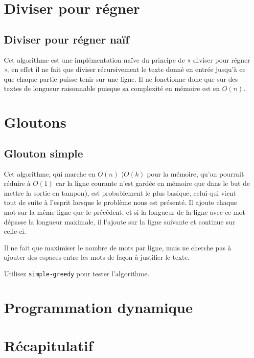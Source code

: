 \documentclass[a4paper, 11pt]{article}
\begin{document}
\section{Diviser pour régner}

\subsection{Diviser pour régner naïf}

Cet algorithme est une implémentation naïve du principe de « diviser pour régner
», en effet il ne fait que diviser récursivement le texte donné en entrée
jusqu'à ce que chaque partie puisse tenir sur une ligne. Il ne fonctionne donc
que sur des textes de longueur raisonnable puisque sa complexité en mémoire est
en $O(n)$. %

\section{Gloutons}

\subsection{Glouton simple}

Cet algorithme, qui marche en $O(n)$ ($O(k)$ pour la mémoire, qu'on pourrait
réduire à $O(1)$ car la ligne courante n'est gardée en mémoire que dans le but
de mettre la sortie en tampon), est probablement le plus basique, celui qui
vient tout de suite à l'esprit lorsque le problème nous est présenté. Il ajoute
chaque mot sur la même ligne que le précédent, et si la longueur de la ligne
avec ce mot dépasse la longueur maximale, il l'ajoute sur la ligne suivante et
continue sur celle-ci.

Il ne fait que maximiser le nombre de mots par ligne, mais ne cherche pas à
ajouter des espaces entre les mots de façon à justifier le texte.

Utilisez \verb|simple-greedy| pour tester l’algorithme.

% 
%

\section{Programmation dynamique}

\section{Récapitulatif}



\end{document}
